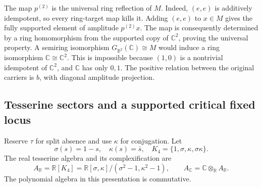 The map $p^{(2)}$ is the universal ring reflection of $M$. Indeed, $(e,e)$ is additively idempotent, so every ring-target map kills it. Adding $(e,e)$ to $x\in M$ gives the fully supported element of amplitude $p^{(2)}x$. The map is consequently determined by a ring homomorphism from the supported copy of $\mathbb C^2$, proving the universal property. A semiring isomorphism $G_{\mathbb B^2}(\mathbb C)\cong M$ would induce a ring isomorphism $\mathbb C\cong\mathbb C^2$. This is impossible because $(1,0)$ is a nontrivial idempotent of $\mathbb C^2$, and $\mathbb C$ has only $0,1$. The positive relation between the original carriers is $b$, with diagonal amplitude projection.

\subsection{Tesserine sectors and a supported critical fixed locus}

Reserve $\tau$ for split absence and use $\kappa$ for conjugation. Let
\[
\sigma(s)=1-s,\quad\kappa(s)=\bar s,\quad K_4=\{1,\sigma,\kappa,\sigma\kappa\}.
\]
The real tesserine algebra and its complexification are
\[
A_{\mathbb R}=\mathbb R[K_4]
=\mathbb R[\sigma,\kappa]/(\sigma^2-1,\kappa^2-1),\qquad
A_{\mathbb C}=\mathbb C\otimes_{\mathbb R}A_{\mathbb R}.
\]
The polynomial algebra in this presentation is commutative.

